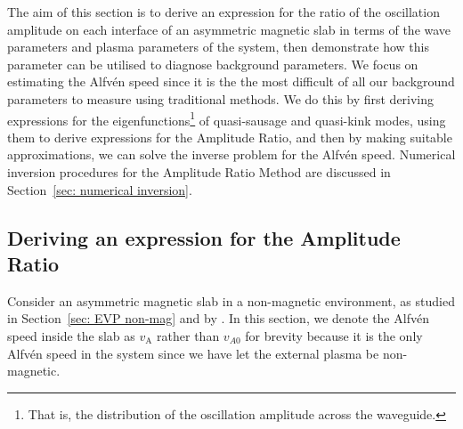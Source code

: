 The aim of this section is to derive an expression for the ratio of the oscillation amplitude on each interface of an asymmetric magnetic slab in terms of the wave parameters and plasma parameters of the system, then demonstrate how this parameter can be utilised to diagnose background parameters. We focus on estimating the Alfv\'{e}n speed since it is the the most difficult of all our background parameters to measure using traditional methods. We do this by first deriving expressions for the eigenfunctions\footnote{That is, the distribution of the oscillation amplitude across the waveguide.} of quasi-sausage and quasi-kink modes, using them to derive expressions for the Amplitude Ratio, and then by making suitable approximations, we can solve the inverse problem for the Alfv\'{e}n speed. Numerical inversion procedures for the Amplitude Ratio Method are discussed in Section~\ref{sec: numerical inversion}.

\subsection{Deriving an expression for the Amplitude Ratio} \label{sec: AR derivation}

Consider an asymmetric magnetic slab in a non-magnetic environment, as studied in Section~\ref{sec: EVP non-mag} and by \cite{all_etal17}. In this section, we denote the Alfv\'{e}n speed inside the slab as $v_\textrm{A}$ rather than $v_{A0}$ for brevity because it is the only Alfv\'{e}n speed in the system since we have let the external plasma be non-magnetic.

